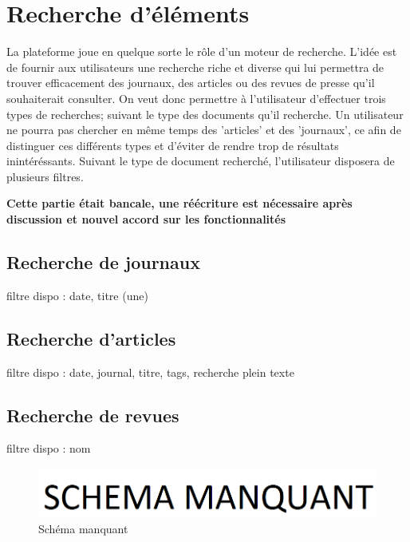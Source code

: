 \section{Recherche d'éléments}
\label{sec:recherche}

La plateforme joue en quelque sorte le rôle d'un moteur de recherche. L'idée est de fournir aux utilisateurs une recherche riche et diverse qui lui permettra de trouver efficacement des journaux, des articles ou des revues de presse qu'il souhaiterait consulter. On veut donc permettre à l'utilisateur d'effectuer trois types de recherches; suivant le type des documents qu'il recherche. Un utilisateur ne pourra pas chercher en même temps des 'articles' et des 'journaux', ce afin de distinguer ces différents types et d'éviter de rendre trop de résultats inintéréssants. Suivant le type de document recherché, l'utilisateur disposera de plusieurs filtres.

\textbf{Cette partie était bancale, une réécriture est nécessaire après discussion et nouvel accord sur les fonctionnalités}

\subsection{Recherche de journaux}
\label{sec:recherche_journal}

filtre dispo : date, titre (une)

\subsection{Recherche d'articles}
\label{sec:recherche_article}

filtre dispo : date, journal, titre, tags, recherche plein texte

\subsection{Recherche de revues}
\label{sec:recherche_revue}

filtre dispo : nom



    \begin{figure}[H]
        \centering
        \includegraphics[width=\textwidth]{figures/manquant.png}
            \caption{Schéma manquant}
            \label{fig:manquant}
    \end{figure}